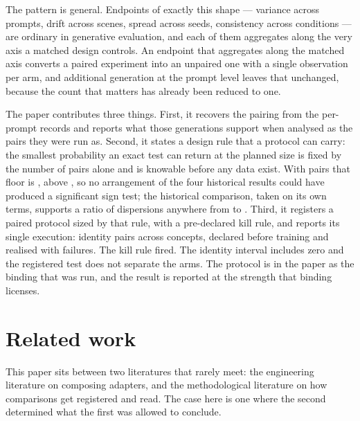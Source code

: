 The pattern is general. Endpoints of exactly this shape --- variance across
prompts, drift across scenes, spread across seeds, consistency across
conditions --- are ordinary in generative evaluation, and each of them
aggregates along the very axis a matched design controls. An endpoint that
aggregates along the matched axis converts a paired experiment into an unpaired
one with a single observation per arm, and additional generation at the prompt
level leaves that unchanged, because the count that matters has already been
reduced to one.

The paper contributes three things. First, it recovers the pairing from the
per-prompt records and reports what those \NPairs{} generations support when
analysed as the pairs they were run as. Second, it states a design rule that a
protocol can carry: the smallest probability an exact test can return at the
planned size is fixed by the number of pairs alone and is knowable before any
data exist. With \NPairs{} pairs that floor is \FloorAtFour{}, above
\Alpha{}, so no arrangement of the four historical results could have produced
a significant sign test; the historical comparison, taken on its own terms,
supports a ratio of dispersions anywhere from \DispLower{} to \DispUpper{}.
Third, it registers a paired protocol sized by that rule, with a pre-declared
kill rule, and reports its single execution: \RunPairs{} identity pairs across
\DesignConcepts{} concepts, declared before training and realised with
\RunFailures{} failures. The kill rule fired. The identity interval includes
zero and the registered test does not separate the arms. The protocol is in
the paper as the binding that was run, and the result is reported at the
strength that binding licenses.

\section{Related work}

This paper sits between two literatures that rarely meet: the engineering
literature on composing adapters, and the methodological literature on how
comparisons get registered and read. The case here is one where the second
determined what the first was allowed to conclude.

